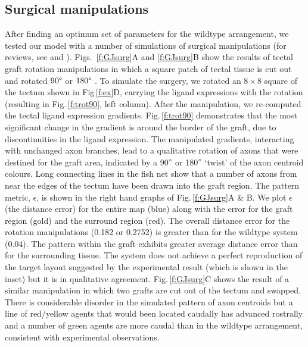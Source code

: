 \documentclass[11pt, a4paper]{article}
\begin{document}
\subsection*{Surgical manipulations}

After finding an optimum set of parameters for the wildtype arrangement, we tested our model with a number of simulations of surgical manipulations (for reviews, see \citet{udin_formation_1988} and \citet{goodhill_retinotectal_1999}).
Figs.~\ref{f:GJsurg}A and \ref{f:GJsurg}B show the results of tectal graft rotation manipulations in which a square patch of tectal tissue is cut out and rotated $90\degree$ or $180\degree$ \citep{chung_observations_1978}.
%
To simulate the surgery, we rotated an $8\times8$ square of the tectum shown in Fig\,\ref{f:ex}D, carrying the ligand expressions with the rotation (resulting in Fig.\,\ref{f:trot90}, left column).
After the manipulation, we re-computed the tectal ligand expression gradients. Fig.\,\ref{f:trot90} demonstrates that the most significant change in the gradient is around the border of the graft, due to discontinuities in the ligand expression.
The manipulated gradients, interacting with unchanged axon branches, lead to a qualitative rotation of axons that were destined for the graft area, indicated by a 90$\degree$ or 180$\degree$ `twist' of the axon centroid colours.
Long connecting lines in the fish net show that a number of axons from near the edges of the tectum have been drawn into the graft region.
The pattern metric, $\epsilon$, is shown in the right hand graphs of Fig.\,\ref{f:GJsurg}A \& B.
We plot $\epsilon$ (the distance error) for the entire map (blue) along with the error for the graft region (gold) and the surround region (red).
The overall distance error for the rotation manipulations (0.182 or 0.2752)  is greater than for the wildtype system (0.04).
The pattern within the graft exhibits greater average distance error than for the surrounding tissue.
The system does not achieve a perfect reproduction of the target layout suggested by the experimental result (which is shown in the inset) but it is in qualitative agreement.
%
Fig.\,\ref{f:GJsurg}C shows the result of a similar manipulation in which two grafts are cut out of the tectum and swapped.
There is considerable disorder in the simulated pattern of axon centroids but a line of red/yellow agents that would been located caudally has advanced rostrally and a number of green agents are more caudal than in the wildtype arrangement, consistent with experimental observations.
\end{document}
